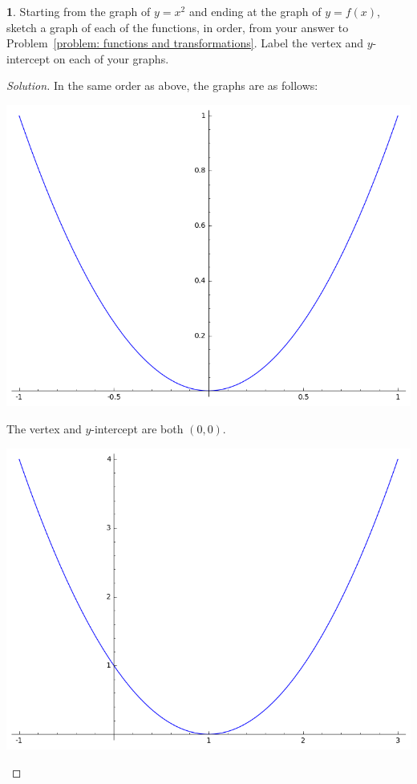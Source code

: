 \documentclass[12pt]{amsart}
\theoremstyle{definition}
\newtheorem{thm}{}
\begin{document}
\begin{thm}\label{problem: graphs}
  Starting from the graph of $y = x^2$ and ending at the graph of $y = f(x)$, sketch a graph of each of the functions, in order, from your answer to Problem~\ref{problem: functions and transformations}.
  Label the vertex and $y$-intercept on each of your graphs.
\end{thm}
\begin{proof}[Solution]
  In the same order as above, the graphs are as follows:
  \begin{center}
    \includegraphics[scale=0.5]{parabola.png}
  \end{center}
  The vertex and $y$-intercept are both $(0,0)$.
  \begin{center}
    \includegraphics[scale=0.5]{parabolaLeft.png}

\end{center}
\end{proof}
\end{document}
